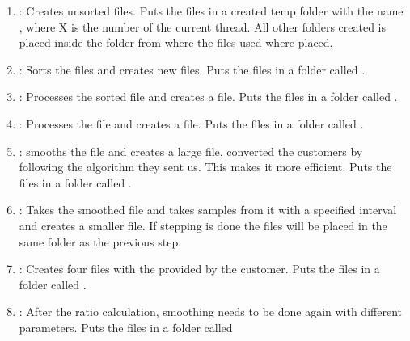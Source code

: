 \begin{enumerate}
\item {}: Creates unsorted  files. Puts the files in a
created temp folder with the name , where X is the number of the current thread. All other folders created is placed inside the folder from where the files used where placed.

\item {}: Sorts the  files and creates new 
files. Puts the files in a folder called .

\item {}: Processes the sorted  file and creates a
 file. Puts the files in a folder called .

\item {}: Processes the  file and creates a 
file. Puts the files in a folder called .

\item {}: smooths the file and creates a large  file,
converted the customers  by following the algorithm they  sent
us. This makes it more efficient. Puts the files in a folder called
.

\item {}: Takes the smoothed  file and takes samples from it
with a specified interval and creates a smaller  file. If stepping is done the files will be placed in the same folder as the previous step.

\item {}: Creates four  files with the
provided by the customer. Puts the files in a folder called .

\item {}: After the ratio calculation, smoothing needs to be done
again with different parameters. Puts the files in a folder called
\end{enumerate}


